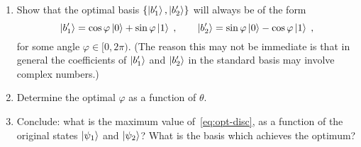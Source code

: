 \documentclass[12pt]{article}
\begin{document}
\begin{enumerate}
\begin{enumerate}[resume]
\item[(d)] Show that the optimal basis $\{\ket{b'_1},\ket{b'_2}\}$ will always be of the form 
$$ \ket{b'_1} = \cos\varphi \ket{0} + \sin\varphi\ket{1}\;,\qquad \ket{b'_2} = \sin\varphi \ket{0} - \cos\varphi\ket{1}\;,$$
for some angle $\varphi\in[0,2\pi)$. (The reason this may not be immediate is that in general the coefficients of $\ket{b'_1}$ and $\ket{b'_2}$ in the standard basis may involve complex numbers.)
\item[(e)] Determine the optimal $\varphi$ as a function of $\theta$. 
\item[(f)] Conclude: what is the maximum value of~\eqref{eq:opt-disc}, as a function of the original states $\ket{\psi_1}$ and $\ket{\psi_2}$? What is the basis which achieves the optimum? 
\end{enumerate}




\end{enumerate}
\end{document}
